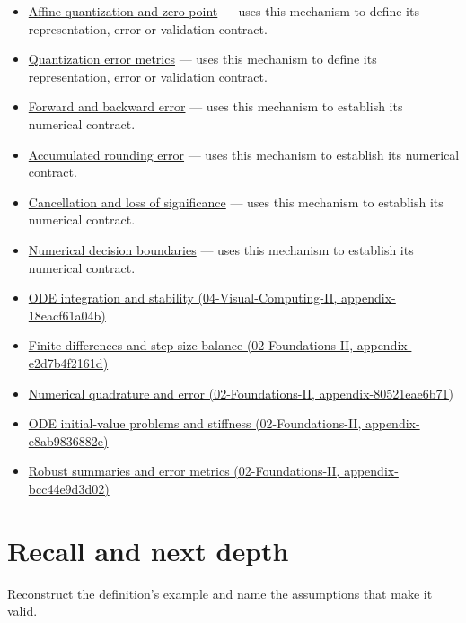 \begin{itemize}
\item
  \hyperref[appendix-d5da3eaabaef]{Affine quantization and zero point} --- uses this mechanism to define its representation, error or validation contract.
\item
  \hyperref[appendix-537171d69d27]{Quantization error metrics} --- uses this mechanism to define its representation, error or validation contract.
\item
  \hyperref[appendix-a7fbaf6d1b1c]{Forward and backward error} --- uses this mechanism to establish its numerical contract.
\item
  \hyperref[appendix-f82e270791c8]{Accumulated rounding error} --- uses this mechanism to establish its numerical contract.
\item
  \hyperref[appendix-a2773a6a2f9d]{Cancellation and loss of significance} --- uses this mechanism to establish its numerical contract.
\item
  \hyperref[appendix-c80db39080be]{Numerical decision boundaries} --- uses this mechanism to establish its numerical contract.
\item
  \href{../04-Visual-Computing-II/main.pdf\#nameddest=appendix-18eacf61a04b}{ODE integration and stability (04-Visual-Computing-II, appendix-18eacf61a04b)}
\item
  \href{../02-Foundations-II/main.pdf\#nameddest=appendix-e2d7b4f2161d}{Finite differences and step-size balance (02-Foundations-II, appendix-e2d7b4f2161d)}
\item
  \href{../02-Foundations-II/main.pdf\#nameddest=appendix-80521eae6b71}{Numerical quadrature and error (02-Foundations-II, appendix-80521eae6b71)}
\item
  \href{../02-Foundations-II/main.pdf\#nameddest=appendix-e8ab9836882e}{ODE initial-value problems and stiffness (02-Foundations-II, appendix-e8ab9836882e)}
\item
  \href{../02-Foundations-II/main.pdf\#nameddest=appendix-bcc44e9d3d02}{Robust summaries and error metrics (02-Foundations-II, appendix-bcc44e9d3d02)}
\end{itemize}

\section{Recall and next depth}\label{appendix-3ae74e89b4e6-recall-and-next-depth}

Reconstruct the definition's example and name the assumptions that make it valid.


